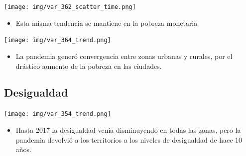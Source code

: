 \documentclass[aspectratio=169]{beamer}
\begin{document}
    
    \begin{slide}{4} 
            \begin{imagecolumn}
                \texttt{[image: img/var\_362\_scatter\_time.png]}
            \end{imagecolumn}
            \begin{textcolumn}
                \begin{itemize}
                    \item Esta misma tendencia se mantiene en la pobreza monetaria
                \end{itemize}
            \end{textcolumn}

    \printcolumns
    \end{slide}
    
    \begin{slide}{4} 
            \begin{imagecolumn}
                \texttt{[image: img/var\_364\_trend.png]}
            \end{imagecolumn}
            \begin{textcolumn}
                \begin{itemize}
                    \item La pandemia generó convergencia entre zonas urbanas y rurales, por el drástico aumento de la pobreza en las ciudades.
                \end{itemize}
            \end{textcolumn}

    \printcolumns
    \end{slide}
    
    
    \subsection{Desigualdad}
 
    \begin{slide}{5} 
            \begin{imagecolumn}
                \texttt{[image: img/var\_354\_trend.png]}
            \end{imagecolumn}
            \begin{textcolumn}
                \begin{itemize}
                    \item Hasta 2017 la desigualdad venia disminuyendo en todas las zonas, pero la pandemia devolvió a los territorios a los niveles de desigualdad de hace 10 años.
                \end{itemize}
            \end{textcolumn}

    \printcolumns
    \end{slide}
    
\end{document}
